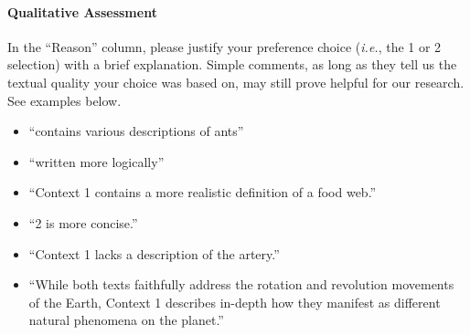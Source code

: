 \begin{tcolorbox}
\paragraph{Qualitative Assessment}

In the ``Reason'' column, please justify your preference choice (\textit{i.e.}, the 1 or 2 selection) with a brief explanation. Simple comments, as long as they tell us the textual quality your choice was based on, may still prove helpful for our research. See examples below.

\begin{itemize}
    \item ``contains various descriptions of ants''
    \item ``written more logically''
    \item ``Context 1 contains a more realistic definition of a food web.''
    \item ``2 is more concise.''
    \item ``Context 1 lacks a description of the artery.''
    \item ``While both texts faithfully address the rotation and revolution movements of the Earth, Context 1 describes in-depth how they manifest as different natural phenomena on the planet.''
\end{itemize}

\end{tcolorbox}




